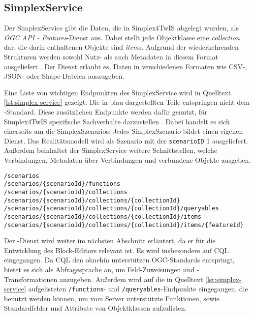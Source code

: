 \subsection{SimplexService}
\label{sec:simplex-service}

Der SimplexService gibt die Daten, die in Simplex4TwIS abgelegt wurden, als \textit{OGC API - Features}-Dienst aus. Dabei stellt jede Objektklasse eine \textit{collection} dar, die darin enthaltenen Objekte sind \textit{items}. Aufgrund der wiederkehrenden Strukturen werden sowohl Nutz- als auch Metadaten in diesem Format ausgeliefert \parencite{grossmannEnvVisioService2022}. Der Dienst erlaubt es, Daten in verschiedenen Formaten wie \acs{CSV}-, \acs{JSON}- oder Shape-Dateien auszugeben.

Eine Liste von wichtigen Endpunkten des SimplexService wird in Quelltext \ref{lst:simplex-service} gezeigt. Die in blau dargestellten Teile entspringen nicht dem \ogcapi-Standard. Diese zusätzlichen Endpunkte werden dafür genutzt, für Simplex4TwIS spezifische Sachverhalte darzustellen \parencite{grossmannEnvVisioService2022}. Dabei handelt es sich einerseits um die SimplexSzenarios: Jedes SimplexSzenario bildet einen eigenen \ogcapi-Dienst. Das Realitätsmodell wird als Szenario mit der \texttt{scenarioID} 1 ausgeliefert. Außerdem beinhaltet der SimplexService weitere Schnittstellen, welche Verbindungen, Metadaten über Verbindungen und verbundene Objekte ausgeben.

\begin{lstlisting}[float=!ht,language=simplexservice,caption={[Ausgewählte Endpunkte des SimplexService]Ausgewählte Endpunkte des SimplexService. Schwarz dargestellte Abschnitte sind Teil des \ogcapi-Standard, während die blauen Teile vom SimplexService hinzugefügt wurden. \parencite{simplex4datagmbhSimplexServiceDokumenation}},label=lst:simplex-service]
/scenarios
/scenarios/{scenarioId}/functions
/scenarios/{scenarioId}/collections
/scenarios/{scenarioId}/collections/{collectionId}
/scenarios/{scenarioId}/collections/{collectionId}/queryables
/scenarios/{scenarioId}/collections/{collectionId}/items
/scenarios/{scenarioId}/collections/{collectionId}/items/{featureId}
\end{lstlisting}

Der \ogcapi-Dienst wird weiter im nächsten Abschnitt erläutert, da er für die Entwicklung des Block-Editors relevant ist. Es wird insbesondere auf \ac{CQL} eingegangen. Da \ac{CQL} den ohnehin unterstützen \ac{OGC}-Standards entspringt, bietet es sich als Abfragesprache an, um Feld-Zuweisungen und -Transformationen anzugeben. Außerdem wird auf die in Quelltext \ref{lst:simplex-service} aufgelisteten \texttt{/functions}- und \texttt{/queryables}-Endpunkte eingegangen, die benutzt werden können, um vom Server unterstützte Funktionen, sowie Standardfelder und Attribute von Objektklassen aufzulisten.
